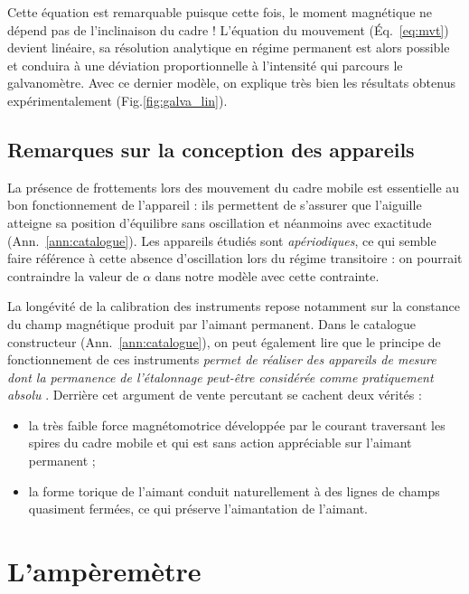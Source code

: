 \documentclass[12pt,a4paper,fleqn]{article}
\begin{document}
Cette équation est remarquable puisque cette fois, le moment magnétique ne dépend pas de l'inclinaison du cadre !
L'équation du mouvement (Éq.~\ref{eq:mvt}) devient linéaire, sa résolution analytique en régime permanent est alors possible et conduira à une déviation proportionnelle à l'intensité qui parcours le galvanomètre.
Avec ce dernier modèle, on explique très bien les résultats obtenus expérimentalement (Fig.\ref{fig:galva_lin}).

\subsection{Remarques sur la conception des appareils}

La présence de frottements lors des mouvement du cadre mobile est essentielle au bon fonctionnement de l'appareil : ils permettent de s'assurer que l'aiguille atteigne sa position d'équilibre \og sans oscillation et néanmoins avec exactitude \fg{} (Ann.~\ref{ann:catalogue}).
Les appareils étudiés sont \emph{apériodiques}, ce qui semble faire référence à cette absence d'oscillation lors du régime transitoire : on pourrait contraindre la valeur de $\alpha$ dans notre modèle avec cette contrainte.

La longévité de la calibration des instruments repose notamment sur la constance du champ magnétique produit par l'aimant permanent.
Dans le catalogue constructeur (Ann.~\ref{ann:catalogue}), on peut également lire que le principe de fonctionnement de ces instruments \og \emph{permet de réaliser des appareils de mesure dont la permanence de l'étalonnage peut-être considérée comme pratiquement absolu} \fg{}.
Derrière cet argument de vente percutant se cachent deux vérités :
\begin{itemize}
\item \og la très faible force magnétomotrice développée par le courant traversant les spires du cadre mobile et qui est sans action appréciable sur l'aimant permanent \fg{} ;
\item la forme torique de l'aimant conduit naturellement à des lignes de champs quasiment fermées, ce qui préserve l'aimantation de l'aimant.
\end{itemize}


\section{L'ampèremètre}
\end{document}
